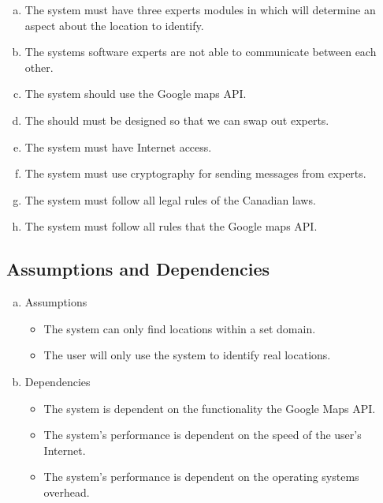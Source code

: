 \documentclass[titlepage]{article}
\begin{document}
\begin{enumerate}[a)]
	\item The system must have three experts modules in which will determine an aspect about the location to identify.
	\item The systems software experts are not able to communicate between each other.
	\item The system should use the Google maps API.
	\item The should must be designed so that we can swap out experts.
	\item The system must have Internet access.
	\item The system must use cryptography for sending messages from experts.
	\item The system must follow all legal rules of the Canadian laws.
	\item The system must follow all rules that the Google maps API.
	
\end{enumerate}

\subsection{Assumptions and Dependencies}
\label{sub:assumptions_and_dependencies}
\begin{enumerate}[a)]
	\item Assumptions
\begin{itemize}
		\item The system can only find locations within a set domain.
		\item The user will only use the system to identify real locations.
		
	\end{itemize}
	\item Dependencies
	
	\begin{itemize}
		\item The system is dependent on the functionality the Google Maps API.
		\item The system's performance is dependent on the speed of the user's Internet.
		\item The system's performance is dependent on the operating systems overhead.
		
	\end{itemize}
\end{enumerate}
\end{document}
